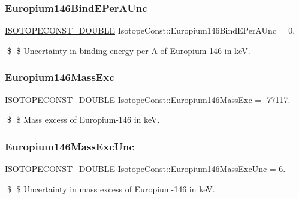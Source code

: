 \subsubsection{\texorpdfstring{Europium146\+Bind\+E\+Per\+A\+Unc}{Europium146BindEPerAUnc}}
{\footnotesize\ttfamily \mbox{\hyperlink{group___isotope_const-_macros_ga8f45a7272ce02c0b4c65c44636ed719a}{I\+S\+O\+T\+O\+P\+E\+C\+O\+N\+S\+T\+\_\+\+D\+O\+U\+B\+LE}} Isotope\+Const\+::\+Europium146\+Bind\+E\+Per\+A\+Unc = 0.}

\$ \$ Uncertainty in binding energy per A of Europium-\/146 in keV. \mbox{\label{group___isotope_const-_europium-_eu146_ga24a1cae86dfb3d69c970c32837d91cb8}} 
\subsubsection{\texorpdfstring{Europium146\+Mass\+Exc}{Europium146MassExc}}
{\footnotesize\ttfamily \mbox{\hyperlink{group___isotope_const-_macros_ga8f45a7272ce02c0b4c65c44636ed719a}{I\+S\+O\+T\+O\+P\+E\+C\+O\+N\+S\+T\+\_\+\+D\+O\+U\+B\+LE}} Isotope\+Const\+::\+Europium146\+Mass\+Exc = -\/77117.}

\$ \$ Mass excess of Europium-\/146 in keV. \mbox{\label{group___isotope_const-_europium-_eu146_gab6eda92713f687290a3610dc7568e533}} 
\subsubsection{\texorpdfstring{Europium146\+Mass\+Exc\+Unc}{Europium146MassExcUnc}}
{\footnotesize\ttfamily \mbox{\hyperlink{group___isotope_const-_macros_ga8f45a7272ce02c0b4c65c44636ed719a}{I\+S\+O\+T\+O\+P\+E\+C\+O\+N\+S\+T\+\_\+\+D\+O\+U\+B\+LE}} Isotope\+Const\+::\+Europium146\+Mass\+Exc\+Unc = 6.}

\$ \$ Uncertainty in mass excess of Europium-\/146 in keV. \mbox{\label{group___isotope_const-_europium-_eu146_gaab6bde1a790ea57ce44529cf835b0f7a}} 

